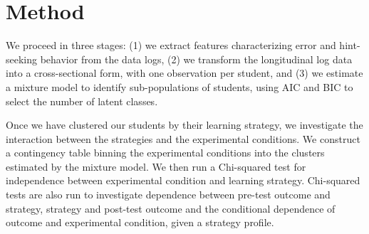\documentclass{edm_template}
\begin{document}

 
\section{Method}
\label{sec:method}

We proceed in three stages: (1) we extract features characterizing error and hint-seeking behavior from the data logs, (2) we transform the longitudinal log data into a cross-sectional form, with one observation per student, and (3) we estimate a mixture model to identify sub-populations of students, using AIC and BIC to select the number of latent classes. 

Once we have clustered our students by their learning strategy, we investigate the interaction between the strategies and the experimental conditions. We construct a contingency table binning the experimental conditions into the clusters estimated by the mixture model. We then run a Chi-squared test for independence between experimental condition and learning strategy. Chi-squared tests are also run to investigate dependence between pre-test outcome and strategy, strategy and post-test outcome and the conditional dependence of outcome and experimental condition, given a strategy profile.
\end{document}
